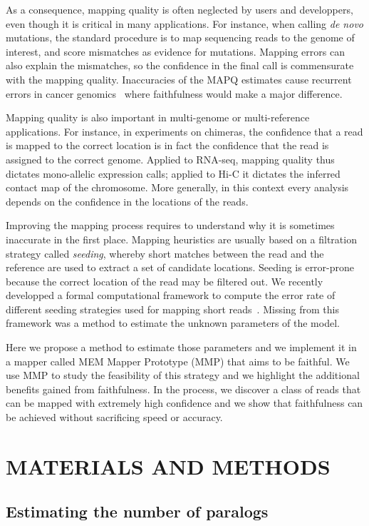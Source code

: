 \documentclass[a4,center,fleqn]{NAR}
\begin{document}
As a consequence, mapping quality is often neglected by users and
developpers, even though it is critical in many applications. For
instance, when calling \textit{de novo} mutations, the standard procedure
is to map sequencing reads to the genome of interest, and score mismatches
as evidence for mutations. Mapping errors can also explain the mismatches,
so the confidence in the final call is commensurate with the mapping
quality. Inaccuracies of the MAPQ estimates cause recurrent errors in
cancer genomics~\cite{dunno} where faithfulness would make a major
difference.

Mapping quality is also important in multi-genome or multi-reference
applications. For instance, in experiments on chimeras, the confidence
that a read is mapped to the correct location is in fact the confidence
that the read is assigned to the correct genome. Applied to RNA-seq,
mapping quality thus dictates mono-allelic expression calls; applied to
Hi-C it dictates the inferred contact map of the chromosome. More
generally, in this context every analysis depends on the confidence in
the locations of the reads.

Improving the mapping process requires to understand why it is sometimes
inaccurate in the first place. Mapping heuristics are usually based on a
filtration strategy called \emph{seeding}, whereby short matches between
the read and the reference are used to extract a set of candidate
locations. Seeding is error-prone because the correct location of the read
may be filtered out. We recently developped a formal computational
framework to compute the error rate of different seeding strategies used
for mapping short reads~\cite{Filion619155}. Missing from this framework
was a method to estimate the unknown parameters of the model.

Here we propose a method to estimate those parameters and we implement it
in a mapper called MEM Mapper Prototype (MMP) that aims to be faithful. We
use MMP to study the feasibility of this strategy and we highlight the
additional benefits gained from faithfulness. In the process, we discover
a class of reads that can be mapped with extremely high confidence and we
show that faithfulness can be achieved without sacrificing speed or
accuracy.


\section{MATERIALS AND METHODS}

\subsection{Estimating the number of paralogs}
\end{document}

